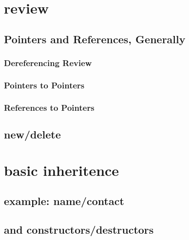 
\begin{frame}
    \titlepage
\end{frame}

\section{review}

\subsection{Pointers and References, Generally}





\subsubsection{Dereferencing Review}



\subsubsection{Pointers to Pointers}



\subsubsection{References to Pointers}



\subsection{new/delete}



\section{basic inheritence}

\subsection{example: name/contact}



\subsection{and constructors/destructors}

